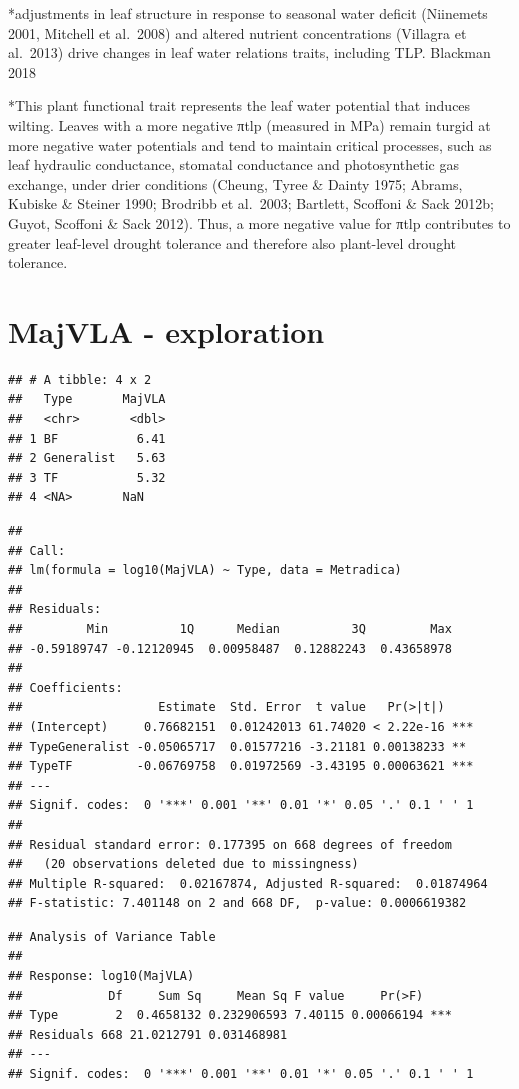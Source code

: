 \documentclass[
]{book}
\begin{document}
*adjustments in leaf structure in response to seasonal water deficit (Niinemets 2001, Mitchell et al.~2008) and altered nutrient concentrations (Villagra et al.~2013) drive changes in leaf water relations traits, including TLP. Blackman 2018

*This plant functional trait represents the leaf water potential that induces wilting. Leaves with a more negative πtlp (measured in MPa) remain turgid at more negative water potentials and tend to maintain critical processes, such as leaf hydraulic conductance, stomatal conductance and photosynthetic gas exchange, under drier conditions (Cheung, Tyree \& Dainty 1975; Abrams, Kubiske \& Steiner 1990; Brodribb et al.~2003; Bartlett, Scoffoni \& Sack 2012b; Guyot, Scoffoni \& Sack 2012). Thus, a more negative value for πtlp contributes to greater leaf-level drought tolerance and therefore also plant-level drought tolerance.

\hypertarget{majvla---exploration}{%
\section{MajVLA - exploration}\label{majvla---exploration}}

\begin{verbatim}
## # A tibble: 4 x 2
##   Type       MajVLA
##   <chr>       <dbl>
## 1 BF           6.41
## 2 Generalist   5.63
## 3 TF           5.32
## 4 <NA>       NaN
\end{verbatim}

\begin{verbatim}
## 
## Call:
## lm(formula = log10(MajVLA) ~ Type, data = Metradica)
## 
## Residuals:
##         Min          1Q      Median          3Q         Max 
## -0.59189747 -0.12120945  0.00958487  0.12882243  0.43658978 
## 
## Coefficients:
##                   Estimate  Std. Error  t value   Pr(>|t|)    
## (Intercept)     0.76682151  0.01242013 61.74020 < 2.22e-16 ***
## TypeGeneralist -0.05065717  0.01577216 -3.21181 0.00138233 ** 
## TypeTF         -0.06769758  0.01972569 -3.43195 0.00063621 ***
## ---
## Signif. codes:  0 '***' 0.001 '**' 0.01 '*' 0.05 '.' 0.1 ' ' 1
## 
## Residual standard error: 0.177395 on 668 degrees of freedom
##   (20 observations deleted due to missingness)
## Multiple R-squared:  0.02167874, Adjusted R-squared:  0.01874964 
## F-statistic: 7.401148 on 2 and 668 DF,  p-value: 0.0006619382
\end{verbatim}

\begin{verbatim}
## Analysis of Variance Table
## 
## Response: log10(MajVLA)
##            Df     Sum Sq     Mean Sq F value     Pr(>F)    
## Type        2  0.4658132 0.232906593 7.40115 0.00066194 ***
## Residuals 668 21.0212791 0.031468981                       
## ---
## Signif. codes:  0 '***' 0.001 '**' 0.01 '*' 0.05 '.' 0.1 ' ' 1
\end{verbatim}
\end{document}
